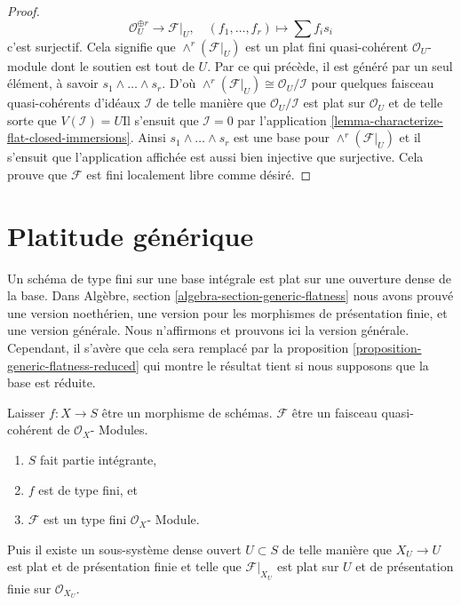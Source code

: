 \begin{proof}
$$
\mathcal{O}_U^{\oplus r} \longrightarrow \mathcal{F}|_U, \quad
(f_1, \ldots, f_r) \longmapsto \sum f_i s_i
$$
c'est surjectif. Cela signifie que
$\wedge^r(\mathcal{F}|_U)$ est un plat fini quasi-cohérent
$\mathcal{O}_U$-module dont le soutien est tout de $U$. Par ce qui précède, il est généré par un seul élément, à savoir
$s_1 \wedge \ldots \wedge s_r$. D'où
$\wedge^r(\mathcal{F}|_U) \cong \mathcal{O}_U/\mathcal{I}$
pour quelques faisceau quasi-cohérents d'idéaux $\mathcal{I}$
de telle manière que $\mathcal{O}_U/\mathcal{I}$ est plat sur $\mathcal{O}_U$ et de telle sorte que $V(\mathcal{I}) = U$Il s'ensuit que $\mathcal{I} = 0$ par l'application \ref{lemma-characterize-flat-closed-immersions}. Ainsi $s_1 \wedge \ldots \wedge s_r$ est une base pour
$\wedge^r(\mathcal{F}|_U)$ et il s'ensuit que l'application affichée est aussi bien injective que surjective. Cela prouve que $\mathcal{F}$ est fini localement libre comme désiré.

\end{proof}






\section{Platitude générique}
\label{section-generic-flatness}

\noindent
Un schéma de type fini sur une base intégrale est plat sur une ouverture dense de la base. Dans Algèbre, section \ref{algebra-section-generic-flatness} nous avons prouvé une version noethérien, une version pour les morphismes de présentation finie, et une version générale. Nous n'affirmons et prouvons ici la version générale. Cependant, il s'avère que cela sera remplacé par la proposition \ref{proposition-generic-flatness-reduced} qui montre le résultat tient si nous supposons que la base est réduite.

\begin{proposition}

\label{proposition-generic-flatness}

Laisser $f : X \to S$ être un morphisme de schémas. $\mathcal{F}$ être un faisceau quasi-cohérent de $\mathcal{O}_X$- Modules.

\begin{enumerate}

\item  $S$ fait partie intégrante,
\item  $f$ est de type fini, et
\item  $\mathcal{F}$ est un type fini $\mathcal{O}_X$- Module.

\end{enumerate}

Puis il existe un sous-système dense ouvert $U \subset S$ de telle manière que
$X_U \to U$ est plat et de présentation finie et telle que
$\mathcal{F}|_{X_U}$ est plat sur $U$ et de présentation finie sur $\mathcal{O}_{X_U}$.

\end{proposition}

